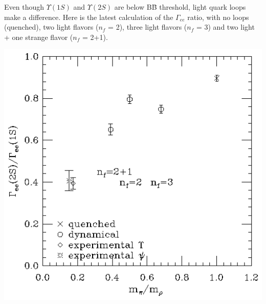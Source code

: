 
\begin{slide*}

\slideframe{}
\LARGE


\vfill

\begin{minipage}{\linewidth}
  Even though $\Upsilon(1S)$ and $\Upsilon(2S)$ are below B\={B}
  threshold, light quark loops make a difference. Here is the latest
  calculation of the $\Gamma_{ee}$ ratio, with no loops (quenched),
  two light flavors ($n_f$ = 2), three light flavors ($n_f$ = 3) and
  two light + one strange flavor ($n_f$ = 2+1).

  \begin{center}
    \includegraphics[width=0.8\linewidth]{strange_quark_matters.eps}
  \end{center}

\end{minipage}

\vfill

\vfill

\end{slide*}

